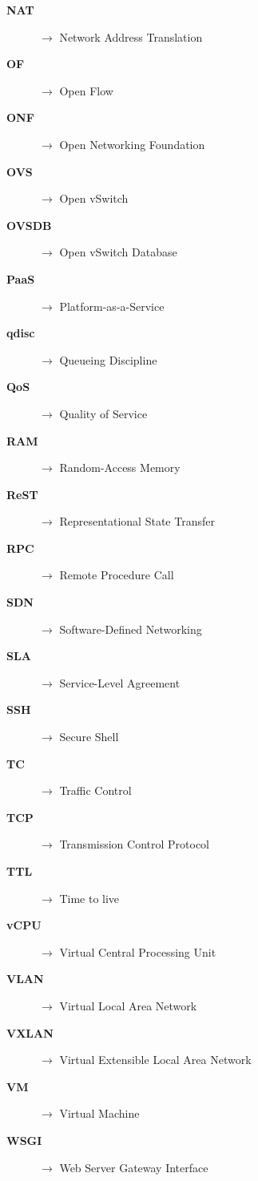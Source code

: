 \begin{description}
\item[\bf{NAT}] $\rightarrow$ Network Address Translation
\item[\bf{OF}] $\rightarrow$ Open Flow
\item[\bf{ONF}] $\rightarrow$ Open Networking Foundation
\item[\bf{OVS}] $\rightarrow$ Open vSwitch
\item[\bf{OVSDB}] $\rightarrow$ Open vSwitch Database
\item[\bf{PaaS}] $\rightarrow$ Platform-as-a-Service
\item[\bf{qdisc}] $\rightarrow$ Queueing Discipline
\item[\bf{QoS}] $\rightarrow$ Quality of Service
\item[\bf{RAM}] $\rightarrow$ Random-Access Memory
\item[\bf{ReST}] $\rightarrow$ Representational State Transfer
\item[\bf{RPC}] $\rightarrow$ Remote Procedure Call
\item[\bf{SDN}] $\rightarrow$ Software-Defined Networking
\item[\bf{SLA}] $\rightarrow$ Service-Level Agreement
\item[\bf{SSH}] $\rightarrow$ Secure Shell
\item[\bf{TC}] $\rightarrow$ Traffic Control
\item[\bf{TCP}] $\rightarrow$ Transmission Control Protocol
\item[\bf{TTL}] $\rightarrow$ Time to live
\item[\bf{vCPU}] $\rightarrow$ Virtual Central Processing Unit
\item[\bf{VLAN}] $\rightarrow$ Virtual Local Area Network
\item[\bf{VXLAN}] $\rightarrow$ Virtual Extensible Local Area Network
\item[\bf{VM}] $\rightarrow$ Virtual Machine
\item[\bf{WSGI}] $\rightarrow$ Web Server Gateway Interface

\end{description}




